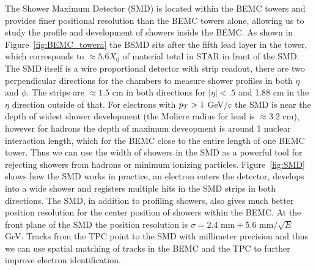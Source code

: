 The Shower Maximum Detector (SMD) is located within the BEMC towers and provides finer positional resolution than the BEMC towers alone, allowing us to study the profile and development of showers inside the BEMC. As shown in Figure~\ref{fig:BEMC_towera} the BSMD sits after the fifth lead layer in the tower, which corresponds to $\approx 5.6 X_{0}$ of material total in STAR in front of the SMD. The SMD itself is a wire proportional detector with strip readout, there are two perpendicular directions for the chambers to measure shower profiles in both $\eta$ and $\phi$. The strips are $\approx 1.5$ cm in both directions for $|\eta| < .5$ and 1.88 cm in the $\eta$ direction outside of that. For electrons with $p_{T} > 1$ GeV/c the SMD is near the depth of widest shower development (the Moliere radius for lead is $\approx 3.2$ cm), however for hadrons the depth of maximum deveopment is around 1 nuclear interaction length, which for the BEMC close to the entire length of one BEMC tower. Thus we can use the width of showers in the SMD as a powerful tool for rejecting showers from hadrons or minimum ionizing particles. Figure~\ref{fig:SMD} shows how the SMD works in practice, an electron enters the detector, develops into a wide shower and registers multiple hits in the SMD strips in both directions. The SMD, in addition to profiling showers, also gives much better position resolution for the center position of showers within the BEMC. At the front plane of the SMD the position resolution is $\sigma = 2.4 \text{ mm} + 5.6 \text{ mm}/\sqrt{E}$ GeV. Tracks from the TPC point to the SMD with millimeter precision and thus we can use spatial matching of tracks in the BEMC and the TPC to further improve electron identification.

